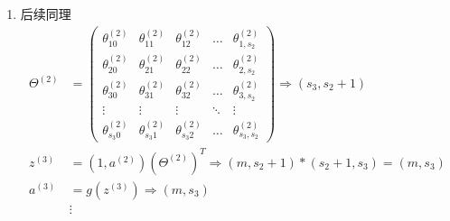 \begin{enumerate}
\item 后续同理 \\
\begin{equation}\begin{aligned}
	\Theta^{(2)} &= 
		\left(\begin{matrix}
			\theta_{10}^{(2)} & \theta_{11}^{(2)} & \theta_{12}^{(2)} & \dots & \theta_{1,s_2}^{(2)} \\
			\theta_{20}^{(2)} & \theta_{21}^{(2)} & \theta_{22}^{(2)} & \dots & \theta_{2,s_2}^{(2)} \\
			\theta_{30}^{(2)} & \theta_{31}^{(2)} & \theta_{32}^{(2)} & \dots & \theta_{3,s_2}^{(2)} \\
			\vdots    & \vdots    & \vdots    & \ddots & \vdots   \\
			\theta_{s_{3}0}^{(2)} & \theta_{s_{3}1}^{(2)} & \theta_{s_{3}2}^{(2)} & \dots & \theta_{s_{3},s_{2}}^{(2)}
		\end{matrix}\right) \Rightarrow {(s_{3},s_2+1)}\\
	z^{(3)} &= (1, a^{(2)}) (\Theta^{(2)})^T \Rightarrow (m,s_2+1) * (s_2+1, s_3) = (m,s_3) \\
	a^{(3)} &= g(z^{(3)}) \Rightarrow {(m,s_3)} \\
	& \vdots \\
\end{aligned} \end{equation}


\end{enumerate}
